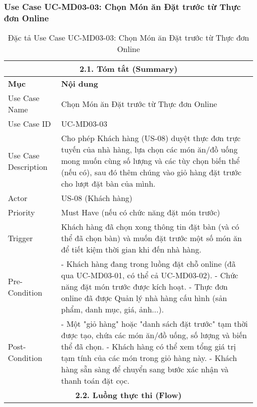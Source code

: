 \subsubsection{Use Case UC-MD03-03: Chọn Món ăn Đặt trước từ Thực đơn Online}
\begin{longtable}{|m{4cm}|p{11cm}|}
\caption{Đặc tả Use Case UC-MD03-03: Chọn Món ăn Đặt trước từ Thực đơn Online} \label{tab:uc_md03_03_revised_v3} \\
\hline
\multicolumn{2}{|c|}{\textbf{2.1. Tóm tắt (Summary)}} \\
\hline
\textbf{Mục} & \textbf{Nội dung} \\
\hline
\endhead %
\hline
\endfoot %
\hline
\endlastfoot %
Use Case Name & Chọn Món ăn Đặt trước từ Thực đơn Online \\
\hline
Use Case ID & UC-MD03-03 \\
\hline
Use Case Description & Cho phép Khách hàng (US-08) duyệt thực đơn trực tuyến của nhà hàng, lựa chọn các món ăn/đồ uống mong muốn cùng số lượng và các tùy chọn biến thể (nếu có), sau đó thêm chúng vào giỏ hàng đặt trước cho lượt đặt bàn của mình. \\
\hline
Actor & US-08 (Khách hàng) \\
\hline
Priority & Must Have (nếu có chức năng đặt món trước) \\
\hline
Trigger & Khách hàng đã chọn xong thông tin đặt bàn (và có thể đã chọn bàn) và muốn đặt trước một số món ăn để tiết kiệm thời gian khi đến nhà hàng. \\
\hline
Pre-Condition & - Khách hàng đang trong luồng đặt chỗ online (đã qua UC-MD03-01, có thể cả UC-MD03-02). \newline - Chức năng đặt món trước được kích hoạt. \newline - Thực đơn online đã được Quản lý nhà hàng cấu hình (sản phẩm, danh mục, giá, ảnh...). \\
\hline
Post-Condition & - Một "giỏ hàng" hoặc "danh sách đặt trước" tạm thời được tạo, chứa các món ăn/đồ uống, số lượng và biến thể đã chọn. \newline - Khách hàng có thể xem tổng giá trị tạm tính của các món trong giỏ hàng này. \newline - Khách hàng sẵn sàng để chuyển sang bước xác nhận và thanh toán đặt cọc. \\
\hline
\multicolumn{2}{|c|}{\textbf{2.2. Luồng thực thi (Flow)}} \\

\end{longtable}
